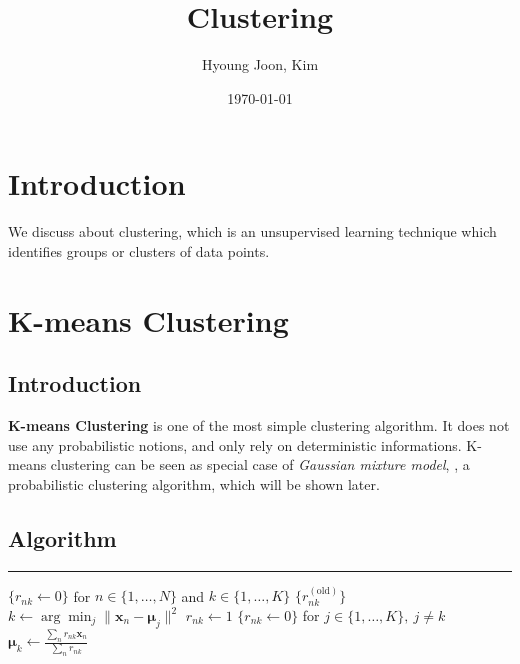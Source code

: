\documentclass{article}
\title{Clustering}
\author{Hyoung Joon, Kim}
\date{\today}
\begin{document}
\maketitle
\tableofcontents
\newpage

\section{Introduction}
    We discuss about clustering, which is an unsupervised learning technique which identifies groups or clusters
    of data points.

\section{K-means Clustering}
    \subsection{Introduction}
        \textbf{K-means Clustering} is one of the most simple clustering algorithm. It does not use any probabilistic notions,
        and only rely on deterministic informations. K-means clustering can be seen as special case of \emph{Gaussian mixture model},
        , a probabilistic clustering algorithm, which will be shown later.
    
    \subsection{Algorithm}
        \begin{algorithm}
            \DontPrintSemicolon
            
            \caption{K-means clustring algorithm}


            \BlankLine
            \hrule
            $\{r_{nk} \leftarrow 0\}$ for $n \in \{1,\dots,N\}$ and $k \in \{1,\dots,K\}$\;
            {
                $\{r_{nk}^{(\text{old})}\}$\;
                {
                    $k \leftarrow \arg\min_j\|\textbf{x}_n - \bm\mu_j\|^2$\;
                    $r_{nk} \leftarrow 1$\;
                    $\{r_{nk} \leftarrow 0\}$ for $j \in \{1,\dots,K\},\ j \neq k$
                }
                {
                    $\bm\mu_k \leftarrow \frac{\sum_n r_{nk}\textbf{x}_n}{\sum_n r_{nk}}$\;
                }
            }

        \end{algorithm}
        
\end{document}
